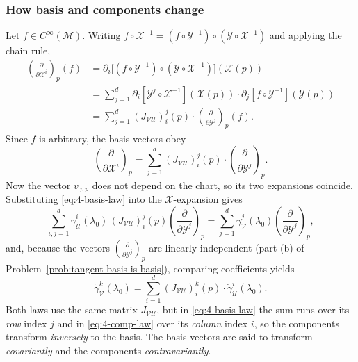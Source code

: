 \documentclass[11pt]{article}
\newcommand{\Cinf}{C^\infty(\mathcal M)}
\begin{document}
\subsubsection*{How basis and components change}
Let $f\in\Cinf$. Writing $f\circ\mathcal X^{-1}=(f\circ\mathcal Y^{-1})\circ(\mathcal Y\circ\mathcal X^{-1})$ and applying the chain rule,
\begin{align*}
\left(\frac{\partial}{\partial\mathcal X^i}\right)_p(f)&=\partial_i\big[(f\circ\mathcal Y^{-1})\circ(\mathcal Y\circ\mathcal X^{-1})\big](\mathcal X(p))\\
&=\sum_{j=1}^d\partial_i[\mathcal Y^j\circ\mathcal X^{-1}](\mathcal X(p))\cdot\partial_j[f\circ\mathcal Y^{-1}](\mathcal Y(p))\\
&=\sum_{j=1}^d(J_{\mathcal{VU}})^j_i(p)\cdot\left(\frac{\partial}{\partial\mathcal Y^j}\right)_p(f).
\end{align*}
Since $f$ is arbitrary, the basis vectors obey
\begin{equation}
\left(\frac{\partial}{\partial\mathcal X^i}\right)_p=\sum_{j=1}^d(J_{\mathcal{VU}})^j_i(p)\cdot\left(\frac{\partial}{\partial\mathcal Y^j}\right)_p.
\tag{4.2}\label{eq:4-basis-law}
\end{equation}
Now the vector $v_{\gamma,p}$ does not depend on the chart, so its two expansions coincide. Substituting \eqref{eq:4-basis-law} into the $\mathcal X$-expansion gives
\[
\sum_{i,j=1}^d\dot\gamma^i_{\mathcal U}(\lambda_0)\,(J_{\mathcal{VU}})^j_i(p)\left(\frac{\partial}{\partial\mathcal Y^j}\right)_p=\sum_{j=1}^d\dot\gamma^j_{\mathcal V}(\lambda_0)\left(\frac{\partial}{\partial\mathcal Y^j}\right)_p,
\]
and, because the vectors $\left(\frac{\partial}{\partial\mathcal Y^j}\right)_p$ are linearly independent (part (b) of Problem~\ref{prob:tangent-basis-is-basis}), comparing coefficients yields
\begin{equation}
\dot\gamma^k_{\mathcal V}(\lambda_0)=\sum_{i=1}^d(J_{\mathcal{VU}})^k_i(p)\cdot\dot\gamma^i_{\mathcal U}(\lambda_0).
\tag{4.3}\label{eq:4-comp-law}
\end{equation}
Both laws use the same matrix $J_{\mathcal{VU}}$, but in \eqref{eq:4-basis-law} the sum runs over its \emph{row} index $j$ and in \eqref{eq:4-comp-law} over its \emph{column} index $i$, so the components transform \emph{inversely} to the basis. The basis vectors are said to transform \emph{covariantly} and the components \emph{contravariantly}.
\end{document}
